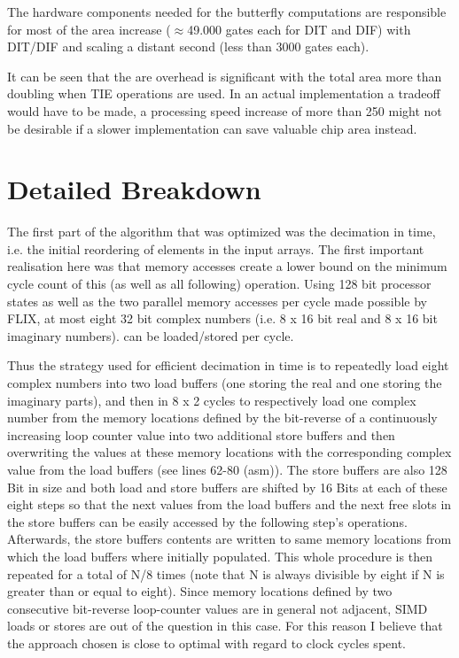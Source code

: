 \documentclass[ngerman, cd=lightcolor]{tudscrreprt}
\begin{document}
The hardware components needed for the butterfly computations are responsible
for most of the area increase ($\approx$49.000 gates each for DIT and DIF) with
DIT/DIF and scaling a distant second (less than 3000 gates each).

It can be seen that the are overhead is significant with the total area more
than doubling when TIE operations are used. In an actual implementation a
tradeoff would have to be made, a processing speed increase of more than 250%
might not be desirable if a slower implementation can save valuable chip area
instead.

\chapter{Detailed Breakdown}

The first part of the algorithm that was optimized was the decimation in time,
i.e.  the initial reordering of elements in the input arrays. The first
important realisation here was that memory accesses create a lower bound on the
minimum cycle count of this (as well as all following) operation. Using 128 bit
processor states as well as the two parallel memory accesses per cycle made
possible by FLIX, at most eight 32 bit complex numbers (i.e. 8 x 16 bit real
and 8 x 16 bit imaginary numbers). can be loaded/stored per cycle.

Thus the strategy used for efficient decimation in time is to repeatedly load
eight complex numbers into two load buffers (one storing the real and one
storing the imaginary parts), and then in 8 x 2 cycles to respectively load one
complex number from the memory locations defined by the bit-reverse of a
continuously increasing loop counter value into two additional store buffers
and then overwriting the values at these memory locations with the
corresponding complex value from the load buffers (see lines 62-80 (asm)). The
store buffers are also 128 Bit in size and both load and store buffers are
shifted by 16 Bits at each of these eight steps so that the next values from
the load buffers and the next free slots in the store buffers can be easily
accessed by the following step’s operations. Afterwards, the store buffers
contents are written to same memory locations from which the load buffers where
initially populated. This whole procedure is then repeated for a total of N/8
times (note that N is always divisible by eight if N is greater than or equal
to eight).  Since memory locations defined by two consecutive bit-reverse
loop-counter values are in general not adjacent, SIMD loads or stores are out
of the question in this case. For this reason I believe that the approach
chosen is close to optimal with regard to clock cycles spent.
\end{document}
